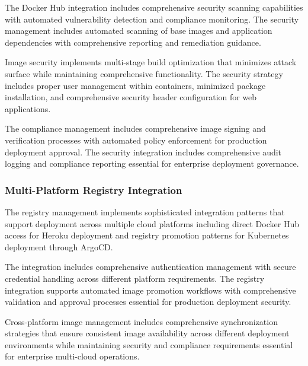 The Docker Hub integration includes comprehensive security scanning capabilities with automated vulnerability detection and compliance monitoring. The security management includes automated scanning of base images and application dependencies with comprehensive reporting and remediation guidance.

Image security implements multi-stage build optimization that minimizes attack surface while maintaining comprehensive functionality. The security strategy includes proper user management within containers, minimized package installation, and comprehensive security header configuration for web applications.

The compliance management includes comprehensive image signing and verification processes with automated policy enforcement for production deployment approval. The security integration includes comprehensive audit logging and compliance reporting essential for enterprise deployment governance.

\subsubsection{Multi-Platform Registry Integration}

The registry management implements sophisticated integration patterns that support deployment across multiple cloud platforms including direct Docker Hub access for Heroku deployment and registry promotion patterns for Kubernetes deployment through ArgoCD.

The integration includes comprehensive authentication management with secure credential handling across different platform requirements. The registry integration supports automated image promotion workflows with comprehensive validation and approval processes essential for production deployment security.

Cross-platform image management includes comprehensive synchronization strategies that ensure consistent image availability across different deployment environments while maintaining security and compliance requirements essential for enterprise multi-cloud operations.